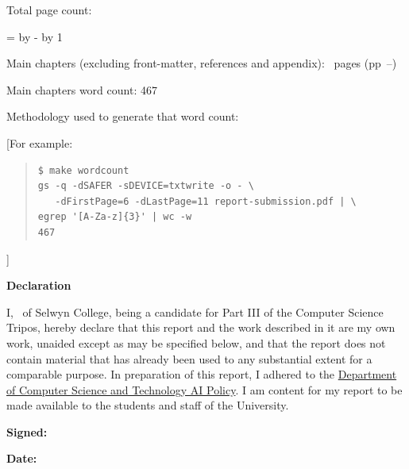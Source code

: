 \documentclass[12pt,a4paper,twoside]{report}
\newif\ifsubmission %
\newcommand{\candidatenumber}{1234N}
\newcommand{\college}{Selwyn College}
\newcommand{\coursefor}{Part III of the Computer Science Tripos}
\begin{document}
\begin{sffamily}
Total page count: \pageref{lastpage}

\makeatletter
\@tempcnta=\relax%
\advance\@tempcnta by -%
\advance\@tempcnta by 1%
\xdef\contentpages{\the\@tempcnta}%
\makeatother

Main chapters (excluding front-matter, references and appendix):
\contentpages~pages
(pp~\pageref{firstcontentpage}--\pageref{lastcontentpage})

Main chapters word count: 467

Methodology used to generate that word count:

[For example:

\begin{quote}
\begin{verbatim}
$ make wordcount
gs -q -dSAFER -sDEVICE=txtwrite -o - \
   -dFirstPage=6 -dLastPage=11 report-submission.pdf | \
egrep '[A-Za-z]{3}' | wc -w
467
\end{verbatim}
\end{quote}

]

\end{sffamily}

\vspace{\fill}
\onehalfspacing
\textbf{\Huge Declaration}
\vspace{40pt}

I,
\makeatletter\ifsubmission
\candidatenumber,
\else
\@author\ of \college,
\fi\makeatother
being a candidate for \coursefor, hereby declare that this report and
the work described in it are my own work, unaided except as may be
specified below, and that the report does not contain material that
has already been used to any substantial extent for a comparable
purpose.
In preparation of this report, I adhered to the
\href{https://www.cst.cam.ac.uk/files/ai_policy.pdf}{Department of
Computer Science and Technology AI Policy}. I am content for
my report to be made available to the students and staff of the
University.



\ifsubmission\else
\bigskip
\textbf{Signed:}
\fi

\bigskip
\textbf{Date:}
\vspace{\fill}
\end{document}

